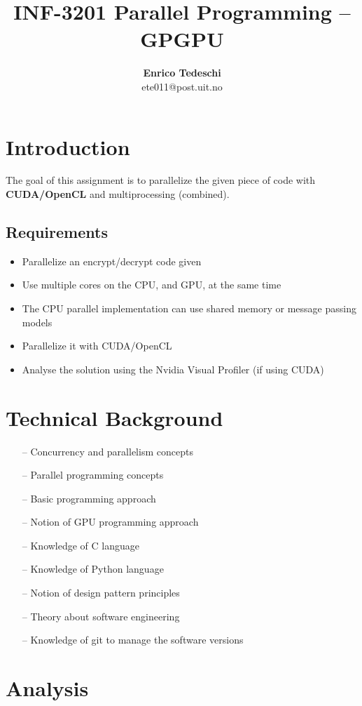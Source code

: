 \documentclass[11pt,conference]{IEEEtran}
\title{INF-3201 Parallel Programming -- GPGPU}
\author{\textbf{Enrico Tedeschi}\\ ete011@post.uit.no }
\begin{document}
\maketitle

\section{Introduction}
The goal of this assignment is to parallelize the given piece of code with \textbf{CUDA/OpenCL} and multiprocessing (combined).

\subsection{Requirements}
\begin{itemize} 
\item Parallelize an encrypt/decrypt code given
\item Use multiple cores on the CPU, and GPU, at the same time
\item The CPU parallel implementation can use shared memory or message passing models
\item Parallelize it with CUDA/OpenCL
\item Analyse the solution using the Nvidia Visual Profiler (if using CUDA)
\end{itemize}


\section{Technical Background}

\begin{itemize} 
\item[--] Concurrency and parallelism concepts
\item[--] Parallel programming concepts
\item[--] Basic programming approach
\item[--] Notion of GPU programming approach 
\item[--] Knowledge of C language
\item[--] Knowledge of Python language
\item[--] Notion of design pattern principles
\item[--] Theory about software engineering
\item[--] Knowledge of git to manage the software versions
\end{itemize}

\section{Analysis}
\end{document}
